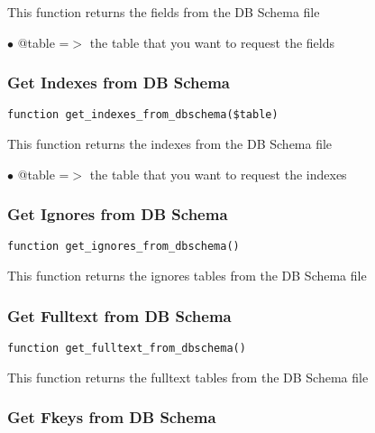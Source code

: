 \documentclass[a4paper]{article}
\begin{document}
This function returns the fields from the DB Schema file

\begin{compactitem}
\item[\color{myblue}$\bullet$] @table =$>$ the table that you want to request the fields
\end{compactitem}

\hypertarget{toc416}{}
\subsubsection{Get Indexes from DB Schema}

\begin{lstlisting}
function get_indexes_from_dbschema($table)
\end{lstlisting}

This function returns the indexes from the DB Schema file

\begin{compactitem}
\item[\color{myblue}$\bullet$] @table =$>$ the table that you want to request the indexes
\end{compactitem}

\hypertarget{toc417}{}
\subsubsection{Get Ignores from DB Schema}

\begin{lstlisting}
function get_ignores_from_dbschema()
\end{lstlisting}

This function returns the ignores tables from the DB Schema file

\hypertarget{toc418}{}
\subsubsection{Get Fulltext from DB Schema}

\begin{lstlisting}
function get_fulltext_from_dbschema()
\end{lstlisting}

This function returns the fulltext tables from the DB Schema file

\hypertarget{toc419}{}
\subsubsection{Get Fkeys from DB Schema}
\end{document}
